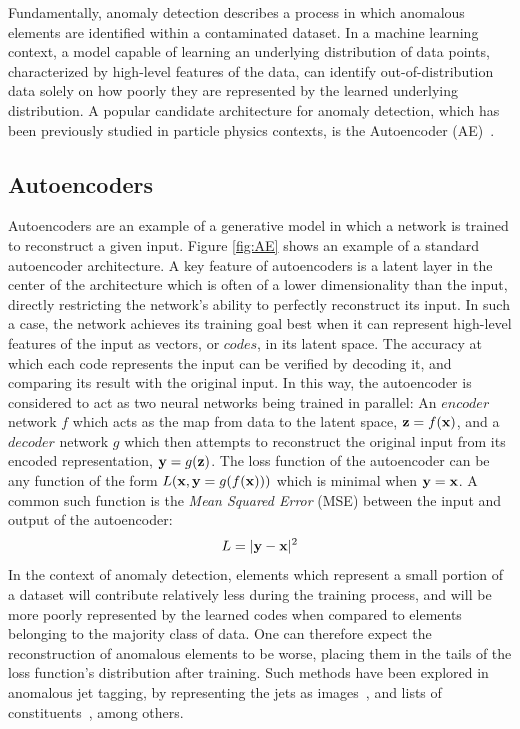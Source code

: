 \documentclass[12pt, a4paper]{article}
\begin{document}
Fundamentally, anomaly detection describes a process in which anomalous elements are identified within a contaminated dataset. 
In a machine learning context, a model capable of learning an underlying distribution of data points, characterized by high-level features of the data, can identify out-of-distribution data solely on how poorly they are represented by the learned underlying distribution. A popular candidate architecture for anomaly detection, which has been previously studied in particle physics contexts, is the Autoencoder (AE)~\cite{bank2020autoencoders, Farina_2020}.

\subsection{Autoencoders}

Autoencoders are an example of a generative model in which a network is trained to reconstruct a given input. 
Figure \ref{fig:AE} shows an example of a standard autoencoder architecture.
A key feature of autoencoders is a latent layer in the center of the architecture which is often of a lower dimensionality than the input, directly restricting the network's ability to perfectly reconstruct its input. 
In such a case, the network achieves its training goal best when it can represent high-level features of the input as vectors, or $codes$, in its latent space. 
The accuracy at which each code represents the input can be verified by decoding it, and comparing
its result with the original input. In this way, the autoencoder is considered
to act as two neural networks being trained in parallel: An $encoder$ network $f$
which acts as the map from data to the latent space, ${\textbf z}=f({\textbf x})$, and
a $decoder$ network $g$ which then attempts to reconstruct the original input from 
its encoded representation, ${\textbf y}=g({\textbf z})$. The loss function of the
autoencoder can be any function of the form $L({\textbf x}, {\textbf y}=g(f({\textbf x})))$ which 
is minimal when ${\textbf y}={\textbf x}$. A common such function is the {\it Mean Squared Error} (MSE)
between the input and output of the autoencoder:
\[L=|{\textbf y} - {\textbf x}|^2\]
In the context of anomaly detection, elements which represent a small portion of
a dataset will contribute relatively less during the training process, and will
be more poorly represented by the learned codes when compared to elements belonging to the majority class of data. One
can therefore expect the reconstruction of anomalous elements to be worse, placing them in the
tails of the loss function's distribution after training. Such methods have been 
explored in anomalous jet tagging, by representing the jets as images~\cite{Farina_2020}, and lists 
of constituents~\cite{Heimel_2019}, among others. 
\end{document}
